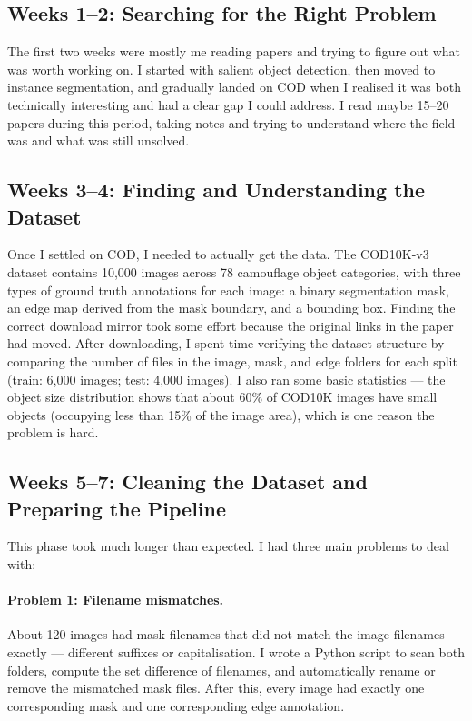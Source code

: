 \documentclass[12pt,a4paper]{report}
\begin{document}
\subsection*{Weeks 1--2: Searching for the Right Problem}

The first two weeks were mostly me reading papers and trying to figure out what was worth working on. I started with salient object detection, then moved to instance segmentation, and gradually landed on COD when I realised it was both technically interesting and had a clear gap I could address. I read maybe 15--20 papers during this period, taking notes and trying to understand where the field was and what was still unsolved.

\subsection*{Weeks 3--4: Finding and Understanding the Dataset}

Once I settled on COD, I needed to actually get the data. The COD10K-v3 dataset contains 10,000 images across 78 camouflage object categories, with three types of ground truth annotations for each image: a binary segmentation mask, an edge map derived from the mask boundary, and a bounding box. Finding the correct download mirror took some effort because the original links in the paper had moved. After downloading, I spent time verifying the dataset structure by comparing the number of files in the image, mask, and edge folders for each split (train: 6,000 images; test: 4,000 images). I also ran some basic statistics — the object size distribution shows that about 60\% of COD10K images have small objects (occupying less than 15\% of the image area), which is one reason the problem is hard.

\subsection*{Weeks 5--7: Cleaning the Dataset and Preparing the Pipeline}

This phase took much longer than expected. I had three main problems to deal with:

\paragraph{Problem 1: Filename mismatches.}
About 120 images had mask filenames that did not match the image filenames exactly — different suffixes or capitalisation. I wrote a Python script to scan both folders, compute the set difference of filenames, and automatically rename or remove the mismatched mask files. After this, every image had exactly one corresponding mask and one corresponding edge annotation.
\end{document}
